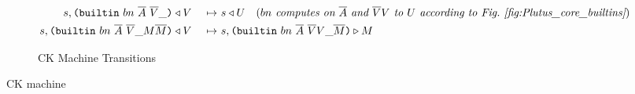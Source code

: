 \documentclass[../plutus-core-specification.tex]{subfiles}
\begin{document}
\begin{figure}[H]
\begin{subfigure}[c]{\linewidth}
\begin{minipage}{\linewidth}
\begin{alignat*}{2}
        s, \texttt{(} \texttt{builtin} ~ bn ~ \overline{A} ~ \overline{V} \_  \texttt{)}& \triangleleft V& ~\mapsto~ &s \triangleleft U 
          \quad (\textit{$bn$ computes on $\overline{A}$ and $\overline{V}V$ to $U$ according to Fig.~\ref{fig:Plutus_core_builtins}})\\
        s, \texttt{(} \texttt{builtin} ~ bn ~ \overline{A} ~ \overline{V} \_ M \overline{M} \texttt{)}& \triangleleft V& ~\mapsto~ &s, \texttt{(} \texttt{builtin} ~ bn ~ \overline{A} ~ \overline{V} V \_ \overline{M} \texttt{)} \triangleright M\\
    \end{alignat*}
\end{minipage}
    \caption{CK Machine Transitions}
    \label{fig:Plutus_core_ck_machine}
\end{subfigure}
\label{fig:ck-machine}
\caption{CK machine}
\end{figure}
\end{document}
